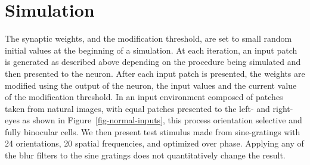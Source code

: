 \documentclass[
  letterpaper,
  number]{elsarticle}
\begin{document}
\hypertarget{simulation}{%
\section{Simulation}\label{simulation}}

The synaptic weights, and the modification threshold, are set to small
random initial values at the beginning of a simulation. At each
iteration, an input patch is generated as described above depending on
the procedure being simulated and then presented to the neuron. After
each input patch is presented, the weights are modified using the output
of the neuron, the input values and the current value of the
modification threshold. In an input environment composed of patches
taken from natural images, with equal patches presented to the left- and
right-eyes as shown in Figure~\ref{fig-normal-inputs}, this process
orientation selective and fully binocular cells\citep{BlaisEtAl98}. We
then present test stimulus made from sine-gratings with 24 orientations,
20 spatial frequencies, and optimized over phase. Applying any of the
blur filters to the sine gratings does not quantitatively change the
result.
\end{document}

